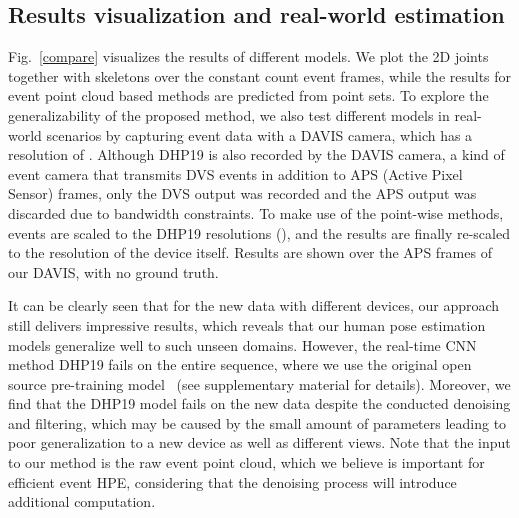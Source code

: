 \documentclass[10pt,twocolumn,letterpaper]{article}
\begin{document}
\subsection{Results visualization and real-world estimation}
Fig.~\ref{compare} visualizes the results of different models. We plot the 2D joints together with skeletons over the constant count event frames, while the results for event point cloud based methods are predicted from point sets.
To explore the generalizability of the proposed method,
we also test different models in real-world scenarios by capturing event data with a DAVIS camera, which has a resolution of . Although DHP19 is also recorded by the DAVIS camera, a kind of event camera that transmits DVS events in addition to APS (Active Pixel Sensor) frames, only the DVS output was recorded and the APS output was discarded due to bandwidth constraints.
To make use of the point-wise methods, events are scaled to the DHP19 resolutions ({}), and the results are finally re-scaled to the resolution of the device itself.
Results are shown over the APS frames of our DAVIS, with no ground truth.

It can be clearly seen that for the new data with different devices, 
our approach still delivers impressive results,
which reveals that our human pose estimation models generalize well to such unseen domains. However, the real-time CNN method DHP19 fails on the entire sequence, where we use the original open source pre-training model~\cite{calabrese2019dhp19} (see supplementary material for details).
Moreover, we find that the DHP19 model fails on the new data despite the conducted denoising and filtering, which may be caused by the small amount of parameters leading to poor generalization to a new device as well as different views. Note that the input to our method is the raw event point cloud, which we believe is important for efficient event HPE, considering that the denoising process will introduce additional computation.

\end{document}
